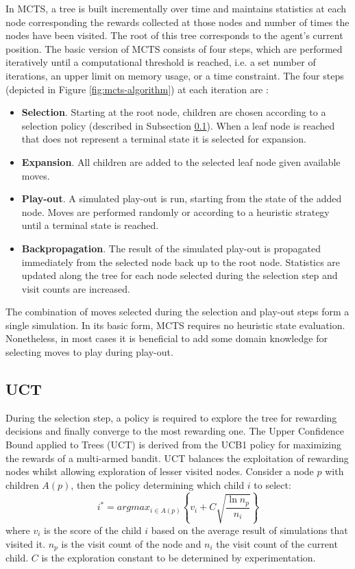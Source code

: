 \documentclass{ecai2010}
\begin{document}
In MCTS, a tree is built incrementally over time and maintains statistics at each node corresponding the rewards collected at those nodes and number of times the nodes have been visited. The root of this tree corresponds to the agent's current position. The basic version of MCTS consists of four steps, which are performed iteratively until a computational threshold is reached, i.e. a set number of iterations, an upper limit on memory usage, or a time constraint. The four steps (depicted in Figure \ref{fig:mcts-algorithm}) at each iteration are \cite{chaslot2008progressive}:
\begin{itemize}
\item {\bf Selection}. Starting at the root node, children are chosen according to a selection policy (described in Subsection \ref{subsec:uct}). When a leaf node is reached that does not represent a terminal state it is selected for expansion.
\item {\bf Expansion}. All children are added to the selected leaf node given available moves.
\item {\bf Play-out}. A simulated play-out is run, starting from the state of the added node. Moves are performed randomly or according to a heuristic strategy until a terminal state is reached.
\item {\bf Backpropagation}. The result of the simulated play-out is propagated immediately from the selected node back up to the root node. Statistics are updated along the tree for each node selected during the selection step and visit counts are increased.
\end{itemize}
The combination of moves selected during the selection and play-out steps form a single simulation. In its basic form, MCTS requires no heuristic state evaluation. Nonetheless, in most cases it is beneficial to add some domain knowledge for selecting moves to play during play-out.

\subsection{UCT}
\label{subsec:uct}
During the selection step, a policy is required to explore the tree for rewarding decisions and finally converge to the most rewarding one. The Upper Confidence Bound applied to Trees (UCT) \cite{kocsis2006bandit} is derived from the UCB1 policy \cite{auer2002using} for maximizing the rewards of a multi-armed bandit. UCT balances the exploitation of rewarding nodes whilst allowing exploration of lesser visited nodes. Consider a node $p$ with children $A(p)$, then the policy determining which child $i$ to select:
\begin{equation}
\label{eq:uct}
i^* = argmax_{i \in A(p)}\left\{ v_i + C \sqrt{ \frac{\ln{n_p}}{n_i}}\right\}
\end{equation}
where $v_i$ is the score of the child $i$ based on the average result of simulations that visited it. $n_p$ is the visit count of the node and $n_i$ the visit count of the current child. $C$ is the exploration constant to be determined by experimentation.
\end{document}

